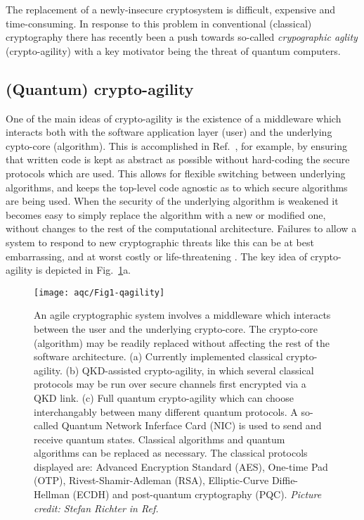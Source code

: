 The replacement of a newly-insecure cryptosystem is difficult, expensive and time-consuming. In response to this problem in conventional (classical) cryptography there has recently been a push towards so-called \emph{crypographic aglity} (crypto-agility) \cite{Sullivan2009, Chen2016} with a key motivator being the threat of quantum computers. %

\subsection{(Quantum) crypto-agility}

One of the main ideas of crypto-agility is the existence of a middleware which interacts both with the software application layer (user) and the underlying cypto-core (algorithm). This is accomplished in Ref.~\cite{Sullivan2009}, for example, by ensuring that written code is kept as abstract as possible without hard-coding the secure protocols which are used. This allows for flexible switching between underlying algorithms, and keeps the top-level code agnostic as to which secure algorithms are being used. When the security of the underlying algorithm is weakened it becomes easy to simply replace the algorithm with a new or modified one, without changes to the rest of the computational architecture. Failures to allow a system to respond to new cryptographic threats like this can be at best embarrassing, and at worst costly or life-threatening \cite{Schneier2016, Schneier2017}. The key idea of crypto-agility is depicted in Fig.~\ref{fig:agility}a. 


\begin{figure}[htp]
\captionsetup{width=0.8\linewidth}
\centering
\texttt{[image: aqc/Fig1-qagility]}
\caption{\label{fig:agility} An agile cryptographic system involves a middleware which interacts between the user and the underlying crypto-core. The crypto-core (algorithm) may be readily replaced without affecting the rest of the software architecture. (a) Currently implemented classical crypto-agility. (b) QKD-assisted crypto-agility, in which several classical protocols may be run over secure channels first encrypted via a QKD link. (c) Full quantum crypto-agility which can choose interchangably between many different quantum protocols. A so-called Quantum Network Inferface Card (NIC) is used to send and receive quantum states. Classical algorithms and quantum algorithms can be replaced as necessary. The classical protocols displayed are: Advanced Encryption Standard (AES), One-time Pad (OTP), Rivest-Shamir-Adleman (RSA), Elliptic-Curve Diffie-Hellman (ECDH) and post-quantum cryptography (PQC). \emph{Picture credit: Stefan Richter in Ref.~\cite{Richter2020}}}
\end{figure}


